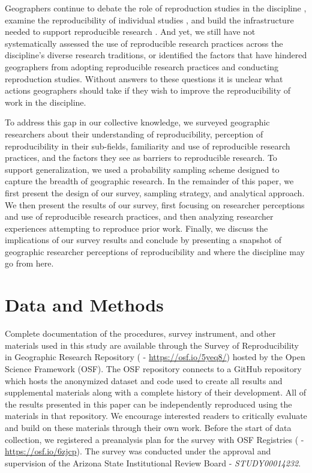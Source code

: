 \documentclass[]{interact}
\theoremstyle{plain}%
\theoremstyle{definition}
\theoremstyle{remark}
\begin{document}
Geographers continue to debate the role of reproduction studies in the discipline \citep{brunsdon2016, goodchild2021Annals, kedron2022replication, kedron2021IJGIS, singleton2016, sui2021, Wainwright2021}, examine the reproducibility of individual studies \citep{Nust_AGILE_2022, ostermann2021}, and build the infrastructure needed to support reproducible research \citep{nust2019, wilson2021, yin2019cybergis}. 
And yet, we still have not systematically assessed the use of reproducible research practices across the discipline's diverse research traditions, or identified the factors that have hindered geographers from adopting reproducible research practices and conducting reproduction studies. 
Without answers to these questions it is unclear what actions geographers should take if they wish to improve the reproducibility of work in the discipline.

To address this gap in our collective knowledge, we surveyed geographic researchers about their understanding of reproducibility, perception of reproducibility in their sub-fields,  familiarity and use of reproducible research practices, and the factors they see as barriers to reproducible research.
To support generalization, we used a probability sampling scheme designed to capture the breadth of geographic research.
In the remainder of this paper, we first present the design of our survey, sampling strategy, and analytical approach. 
We then present the results of our survey, first focusing on researcher perceptions and use of reproducible research practices, and then analyzing researcher experiences attempting to reproduce prior work. 
Finally, we discuss the implications of our survey results and conclude by presenting a snapshot of geographic researcher perceptions of reproducibility and where the discipline may go from here. 


\section*{Data and Methods}
Complete documentation of the procedures, survey instrument, and other materials used in this study are available through the Survey of Reproducibility in Geographic Research Repository (\citet{Kedron_Holler_Bardin_Hilgendorf_2022} - \url{https://osf.io/5yeq8/}) hosted by the Open Science Framework (OSF).
The OSF repository connects to a GitHub repository which hosts the anonymized dataset and code used to create all results and supplemental materials along with a complete history of their development. 
All of the results presented in this paper can be independently reproduced using the materials in that repository.
We encourage interested readers to critically evaluate and build on these materials through their own work.
Before the start of data collection, we registered a preanalysis plan for the survey with OSF Registries (\citet{Kedron_Survey_PAP} - \url{https://osf.io/6zjcp}). 
The survey was conducted under the approval and supervision of the Arizona State Institutional Review Board - \textit{STUDY00014232}.
\end{document}
